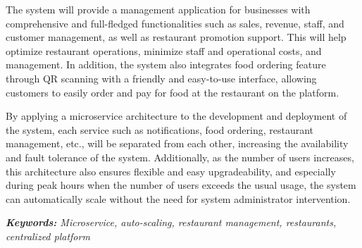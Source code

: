 The system will provide a management application for businesses with comprehensive and full-fledged functionalities such as sales, revenue, staff, and customer management, as well as restaurant promotion support.
This will help optimize restaurant operations, minimize staff and operational costs, and management.
In addition, the system also integrates food ordering feature through QR scanning with a friendly and easy-to-use interface, allowing customers to easily order and pay for food at the restaurant on the platform.

By applying a microservice architecture to the development and deployment of the system, each service such as notifications, food ordering, restaurant management, etc., will be separated from each other, increasing the availability and fault tolerance of the system.
Additionally, as the number of users increases, this architecture also ensures flexible and easy upgradeability, and especially during peak hours when the number of users exceeds the usual usage, the system can automatically scale without the need for system administrator intervention.
\vspace{-0.5cm}
\begin{flushleft}
  \textit{\textbf{Keywords: } Microservice, auto-scaling, restaurant management, restaurants, centralized platform}
\end{flushleft}
\changefontsizes[16pt]{13pt}

